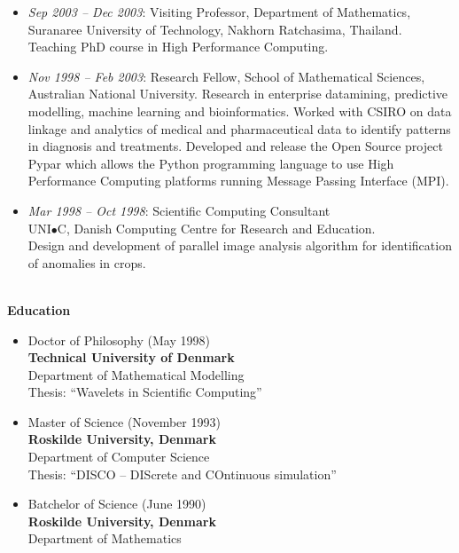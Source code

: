 \documentclass[11pt,a4paper]{article}
\begin{document}
\begin{itemize}
\item {\em Sep 2003 -- Dec 2003}: Visiting Professor,
      Department of Mathematics,
      Suranaree University of Technology, Nakhorn Ratchasima, Thailand. Teaching PhD course in
      High Performance Computing.
\item {\em Nov 1998 -- Feb 2003}: Research Fellow,
      School of Mathematical Sciences, Australian National University.
      Research in enterprise datamining, predictive modelling, machine learning and bioinformatics. Worked with CSIRO on data linkage and analytics of medical and pharmaceutical data to identify patterns in diagnosis and treatments. Developed and release the Open Source project Pypar which allows the Python programming language to use High Performance Computing platforms running Message Passing Interface (MPI).
\item {\em Mar 1998 -- Oct 1998}: Scientific Computing Consultant \\
      UNI$\bullet$C, Danish Computing Centre for Research and Education.\\
      Design and development of parallel image analysis algorithm for identification of anomalies in crops.
\end{itemize}

\begin{center}
  \hrulefill \\
  {\bf Education} \\[-0.2cm]
  \hrulefill
\end{center}

\begin{itemize}
\item Doctor of Philosophy (May 1998) \\
{\bf Technical University of Denmark} \\
Department of Mathematical Modelling  \\
Thesis: ``Wavelets in Scientific Computing''\\

\item  Master of Science (November 1993) \\
{\bf Roskilde University, Denmark} \\
Department of Computer Science \\
Thesis: ``DISCO -- DIScrete and COntinuous simulation''\\

\item  Batchelor of Science (June 1990) \\
{\bf Roskilde University, Denmark} \\
Department of Mathematics \\
\end{itemize}
\end{document}
